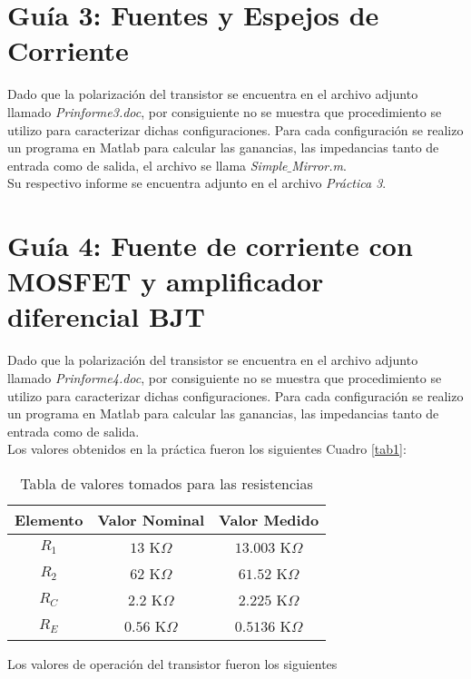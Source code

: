 \documentclass[11pt,graphicx,caption,rotating]{article}
\begin{document}
\section{Guía 3: Fuentes y Espejos de Corriente}
\noindent
Dado que la polarización del transistor se encuentra en el archivo adjunto llamado \textit{Prinforme3.doc}, por consiguiente no se muestra que procedimiento se utilizo para caracterizar dichas configuraciones. Para cada configuración se realizo un programa en Matlab para calcular las ganancias, las impedancias tanto de entrada como de salida, el archivo se llama \textit{Simple$\_$Mirror.m}.\\
Su respectivo informe se encuentra adjunto en el archivo \textit{Práctica 3}.

\section{Guía 4: Fuente de corriente con MOSFET y amplificador diferencial BJT}
\noindent
Dado que la polarización del transistor se encuentra en el archivo adjunto llamado \textit{Prinforme4.doc}, por consiguiente no se muestra que procedimiento se utilizo para caracterizar dichas configuraciones. Para cada configuración se realizo un programa en Matlab para calcular las ganancias, las impedancias tanto de entrada como de salida.\\
Los valores obtenidos en la práctica fueron los siguientes Cuadro \ref{tab1}:
\begin{table}[H]
	\centering
\begin{tabular}[c]{|c||c|c|} \hline
Elemento & Valor Nominal & Valor Medido \\ \hline
$R_1$ & $13$ K$\Omega$ & $13.003$ K$\Omega$ \\ \hline
$R_2$ & $62$ K$\Omega$ & $61.52$ K$\Omega$ \\ \hline
$R_C$ & $2.2$ K$\Omega$ & $2.225$ K$\Omega$ \\ \hline
$R_E$ & $0.56$ K$\Omega$ & $0.5136$ K$\Omega$ \\ \hline
\end{tabular}
	\caption{Tabla de valores tomados para las resistencias}
	\label{tab15}
\end{table}
\noindent
Los valores de operación del transistor fueron los siguientes
\end{document}
